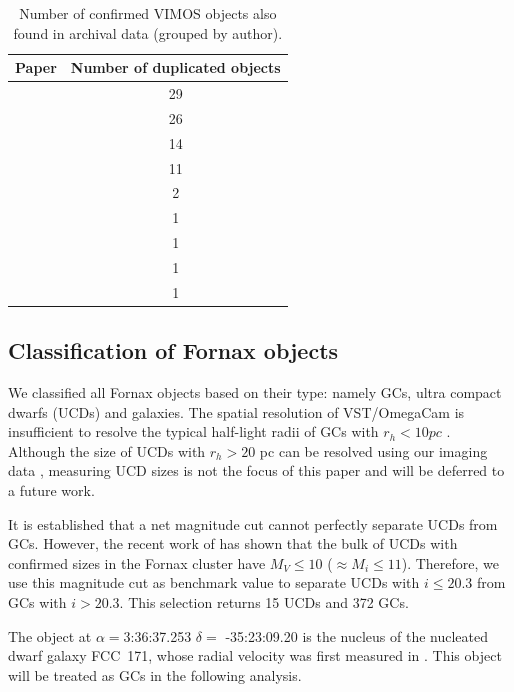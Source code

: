 \documentclass[useAMS,usenatbib]{mn2e}
\newcommand{\kms}{\mbox{\,km~s$^{-1}$}}
\begin{document}
\begin{table}
\centering
\label{mathmode}
\begin{tabular}{@{}l c}
\hline
Paper & Number of duplicated objects \\
\hline
\citet{Dirsch04} &         29 \\
\citet{Schuberth10} &       26 \\
\citet{Bergond07}  &     14 \\
\citet{Firth07}   &      11 \\
\citet{Chilingarian11} &     2 \\
\citet{Mieske04} &       1 \\
\citet{Hilker07}  &     1 \\
\citet{Francis12}   &     1 \\
\citet{Drinkwater00}  &    1 \\
\hline
\end{tabular}
\caption{Number of confirmed VIMOS objects also found in archival data (grouped by author). }
\label{tab:authors} 
\end{table}

\subsection{Classification of Fornax objects}

We classified all Fornax objects based on their type: namely GCs, ultra compact dwarfs (UCDs) and galaxies. The spatial resolution of VST/OmegaCam is insufficient to resolve the typical half-light radii of GCs with $r_h < 10 pc$ \citep{Masters}. Although the size of UCDs with $r_h > 20$ pc can be resolved using our imaging data \citep{Cantiello15}, measuring UCD sizes is not the focus of this paper and will be deferred to a future work.

It is established that a net magnitude cut cannot perfectly separate UCDs from GCs. However, the recent work of \citet{Voggel16} has shown that the bulk of UCDs with confirmed sizes in the Fornax cluster have $M_V \le 10$ ($\approx M_i \le 11$). Therefore, we use this magnitude cut as benchmark value to separate UCDs with $i \le 20.3$ from GCs with $i > 20.3$. This selection returns 15 UCDs and 372 GCs. 

The object at $\alpha=$3:36:37.253 $\delta=$ -35:23:09.20 is the nucleus of the nucleated dwarf galaxy FCC~171, whose radial velocity was first measured in \citet{Bergond07}. This object will be treated as GCs in the following analysis.  
\end{document}
